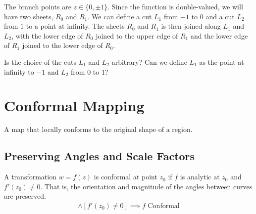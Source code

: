 \documentclass[12pt, english]{book}
\begin{document}
\begin{example}
\begin{figure}[H]
		\end{figure}
		The branch points are \(z \in \{0, \pm 1\}\). Since the function is double-valued, we will have two sheets, \(R_0\) and \(R_1\). We can define a cut \(L_1\) from \(-1\) to \(0\) and a cut \(L_2\) from \(1\) to a point at infinity. The sheets \(R_0\) and \(R_1\) is then joined along \(L_1\) and \(L_2\), with the lower edge of \(R_0\) joined to the upper edge of \(R_1\) and the lower edge of \(R_1\) joined to the lower edge of \(R_0\).
		\begin{question}
			Is the choice of the cuts \(L_1\) and \(L_2\) arbitrary? Can we define \(L_1\) as the point at infinity to \(-1\) and \(L_2\) from \(0\) to \(1\)?
		\end{question}
	\end{example}

	\chapter{Conformal Mapping} \label{Conformal Mapping Chapter - Complex}
	
	
	A map that locally conforms to the original shape of a region.

	\section{Preserving Angles and Scale Factors} \label{Preserning Angles and Scale Factors}
	
	\begin{definition}[Conformal]
		\label{Conformal Definition - Complex}
		A transformation \(w = f(z)\) is conformal at point \(z_0\) if \(f\) is analytic at \(z_0\) and \(f'(z_0) \neq 0 \). That is, the orientation and magnitude of the angles between curves are preserved.
		\begin{align*}
			[f \text{ analytic at } z_0] \land [f'(z_0) \neq 0]
			\implies f \text{ Conformal}
		\end{align*}
	\end{definition}
	
\end{document}
